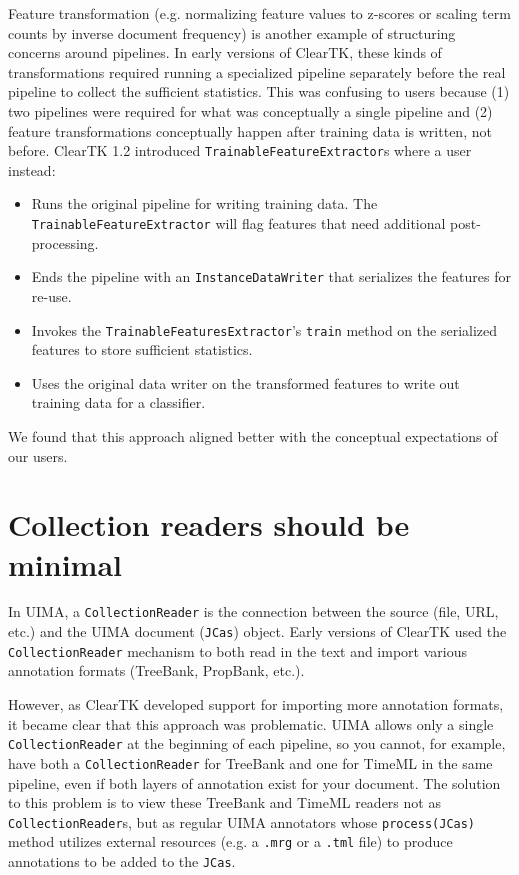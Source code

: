 \documentclass[10pt, a4paper]{article}
\newcommand{\code}[1]{\texttt{\small #1}}
\begin{document}
Feature transformation (e.g. normalizing feature values to z-scores or scaling term counts by inverse document frequency) is another example of structuring concerns around pipelines.
In early versions of ClearTK, these kinds of transformations required running a specialized pipeline separately before the real pipeline to collect the sufficient statistics.
This was confusing to users because (1) two pipelines were required for what was conceptually a single pipeline and (2) feature transformations conceptually happen after training data is written, not before.
ClearTK 1.2 introduced \code{TrainableFeatureExtractor}s where a user instead:
\begin{itemize}
\item Runs the original pipeline for writing training data. The \code{TrainableFeatureExtractor} will flag features that need additional post-processing.
\item Ends the pipeline with an \code{InstanceDataWriter} that serializes the features for re-use.
\item Invokes the \code{TrainableFeaturesExtractor}'s \code{train} method on the serialized features to store sufficient statistics.
\item Uses the original data writer on the transformed features to write out training data for a classifier.
\end{itemize}
We found that this approach aligned better with the conceptual expectations of our users.


\section{Collection readers should be minimal}
In UIMA, a \code{CollectionReader} is the connection between the source (file, URL, etc.) and the UIMA document (\code{JCas}) object.
Early versions of ClearTK used the \code{CollectionReader} mechanism to both read in the text and import various annotation formats (TreeBank, PropBank, etc.).

However, as ClearTK developed support for importing more annotation formats, it became clear that this approach was problematic.
UIMA allows only a single \code{CollectionReader} at the beginning of each pipeline, so you cannot, for example, have both a \code{CollectionReader} for TreeBank and one for TimeML in the same pipeline, even if both layers of annotation exist for your document.
The solution to this problem is to view these TreeBank and TimeML readers not as \code{CollectionReader}s, but as regular UIMA annotators whose \code{process(JCas)} method utilizes external resources (e.g. a \code{.mrg} or a \code{.tml} file) to produce annotations to be added to the \code{JCas}.
\end{document}
